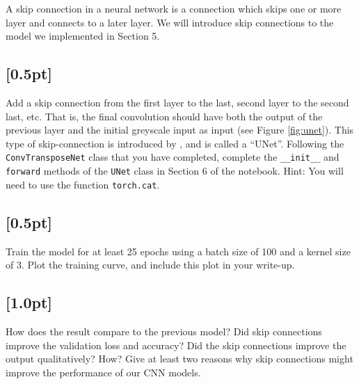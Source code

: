 A skip connection in a neural network is a connection which skips one or more layer and connects to a later layer. 
We will introduce skip connections to the model we implemented in Section 5.

\subsection{{\color{blue}[0.5pt]} \LI}

Add a skip connection from the first layer to the last, second layer to the second last, etc. 
That is, the final convolution should have both the output of the previous layer and the initial greyscale input as input (see Figure \ref{fig:unet}). 
This type of skip-connection is introduced by \cite{ronneberger2015u}, and is called a ``UNet''. 
Following the \texttt{ConvTransposeNet} class that you have completed, complete the \texttt{\_\_init\_\_} and \texttt{forward} methods of the \texttt{UNet} class in Section 6 of the notebook.
Hint: You will need to use the function \texttt{torch.cat}.

\subsection{{\color{blue}[0.5pt]} \LIV}

Train the model for at least 25 epochs using a batch size of 100 and a kernel size of 3. Plot the training curve, and include this plot in your write-up.

\subsection{{\color{blue}[1.0pt]} \LIII}

How does the result compare to the previous model? 
Did skip connections improve the validation loss and accuracy? 
Did the skip connections improve the output qualitatively? How? 
Give at least two reasons why skip connections might improve the performance of our CNN models.